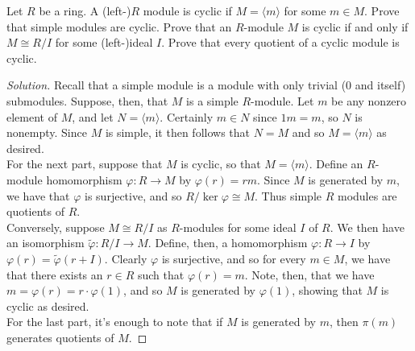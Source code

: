 \documentclass[12pt]{article}
\newenvironment{problem}[2][Problem]{\begin{trivlist}
\item[\hskip \labelsep {\bfseries #1}\hskip \labelsep {\bfseries #2.}]}{\end{trivlist}}
\newenvironment{solution}
  {\renewcommand\qedsymbol{$\blacksquare$}\begin{proof}[Solution]}
{\end{proof}}
\theoremstyle{remark}
\begin{document}
\begin{problem}{6.16}
  Let $R$ be a ring.
  A (left-)$R$ module is cyclic if $M=\langle m\rangle$ for some $m\in M$.
  Prove that simple modules are cyclic.
  Prove that an $R$-module $M$ is cyclic if and only if $M\cong R/I$ for some
  (left-)ideal $I$.
  Prove that every quotient of a cyclic module is cyclic.
\end{problem}
\begin{solution}
  Recall that a simple module is a module with only trivial (0 and itself)
  submodules.
  Suppose, then, that $M$ is a simple $R$-module.
  Let $m$ be any nonzero element of $M$, and let $N=\langle m\rangle$.
  Certainly $m\in N$ since $1m=m$, so $N$ is nonempty.
  Since $M$ is simple, it then follows that $N=M$ and so $M=\langle m\rangle$
  as desired.\\
  \indent For the next part, suppose that $M$ is cyclic, so that 
  $M=\langle m\rangle$.
  Define an $R$-module homomorphism $\varphi:R\to M$ by $\varphi(r)=rm$.
  Since $M$ is generated by $m$, we have that $\varphi$ is surjective,
  and so $R/\ker\varphi\cong M$.
  Thus simple $R$ modules are quotients of $R$. \\
  \indent Conversely, suppose $M\cong R/I$ as $R$-modules for some ideal $I$
  of $R$.
  We then have an isomorphism $\widetilde\varphi:R/I\to M$.
  Define, then, a homomorphism $\varphi:R\to I$ by 
  $\varphi(r)=\widetilde\varphi(r+I)$.
  Clearly $\varphi$ is surjective, and so for every $m\in M$, we have that
  there exists an $r\in R$ such that $\varphi(r)=m$.
  Note, then, that we have $m=\varphi(r)=r\cdot\varphi(1)$, and so
  $M$ is generated by $\varphi(1)$, showing that $M$ is cyclic as desired.\\
  \indent For the last part, it's enough to note that if $M$ is generated
  by $m$, then $\pi(m)$ generates quotients of $M$.
\end{solution}
\end{document}
